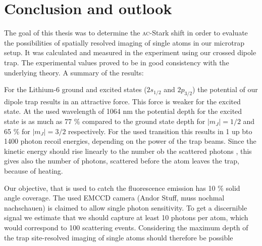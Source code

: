 \chapter{Conclusion and outlook}

The goal of this thesis was to determine the \textsc{ac}-Stark shift in order to evaluate the possibilities of spatially resolved imaging of single atoms in our microtrap setup. It was calculated and measured in the experiment using our crossed dipole trap. The experimental values proved to be in good consistency with the underlying theory. A summary of the results:

For the Lithium-6 ground and excited states ($2s_{1/2}$ and $2p_{3/2}$) the potential of our dipole trap results in an attractive force. This force is weaker for the excited state. At the used wavelength of 1064 nm the potential depth for the excited state is as much as 77 \% compared to the ground state depth for $|m_J|=1/2$ and 65 \% for $|m_J|=3/2$ respectively. For the used transition this results in 1 up bto 1400 photon recoil energies, depending on the power of the trap beams. Since the kinetic energy should rise linearly to the number ob the scattered photons \cite{guck das nach Jonathan!}, this gives also the number of photons, scattered before the atom leaves the trap, because of heating. 

Our objective, that is used to catch the fluorescence emission has 10 \% solid angle coverage. The used EMCCD camera (Andor Stuff, muss nochmal nachschauen) is claimed to allow single photon sensitivity. To get a discernible signal we estimate that we should capture at least 10 photons per atom, which would correspond to 100 scattering events. Considering the maximum depth of the trap site-resolved imaging of single atoms should therefore be possible





%
